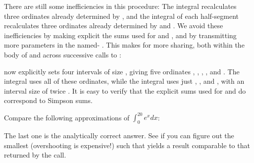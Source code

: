 There are still some inefficiencies in this
procedure: The integral  recalculates three
ordinates already determined by , and the integral
of each half-segment recalculates three ordinates
already determined by  and .  We avoid
these inefficiencies by making explicit the sums used
for  and , and by transmitting more parameters
in the named- .  This makes for
more sharing, both within the body of 
and across successive calls to :


\n {} now explicitly sets four
intervals of size , giving five ordinates ,
, , , and .  The integral
 uses all of these ordinates, while the integral
 uses just , , and , with an
interval size of twice .  It is easy to verify that
the explicit sums used for  and  do correspond
to Simpson sums.

Compare the following approximations of
$\int_0^{20} e^x dx$:


\n The last one is the analytically correct answer.  See
if you can figure out the smallest  (overshooting is
expensive!)
such that  yields a result
comparable to that returned by the 
call.


